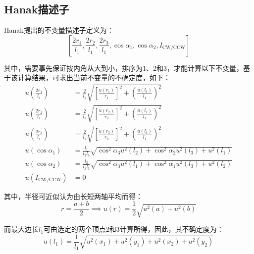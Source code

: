 \documentclass{article}
\begin{document}
\subsection{Hanak描述子}
Hanak\cite{hanakCraterIdentificationAlgorithm2010}提出的不变量描述子定义为：
\begin{equation}
  \left[\frac{2r_1}{l_1},\frac{2r_2}{l_1},\frac{2r_3}{l_1},\cos\alpha_1,\cos\alpha_2,I_\mathrm{CW/CCW}\right]
\end{equation}\par
其中，需要事先保证按内角从大到小，排序为1、2和3，才能计算以下不变量，基于该计算结果，可求出当前不变量的不确定度，如下：
\begin{equation}
  \begin{aligned}
    u\left(\frac{2r_1}{l_1}\right)&=\frac{2}{l_1}\sqrt{\left[\frac{u(r_1)}{r_1}\right]^2+\left(\frac{u(l_1)}{l_1}\right)^2}\\
    u\left(\frac{2r_2}{l_1}\right)&=\frac{2}{l_1}\sqrt{\left[\frac{u(r_2)}{r_2}\right]^2+\left(\frac{u(l_1)}{l_1}\right)^2}\\
    u\left(\frac{2r_3}{l_1}\right)&=\frac{2}{l_1}\sqrt{\left[\frac{u(r_3)}{r_3}\right]^2+\left(\frac{u(l_1)}{l_1}\right)^2}\\
    u(\cos\alpha_1)&=\frac{l_1}{l_2l_3}\sqrt{\cos^2\alpha_3u^2(l_2)+\cos^2\alpha_2u^2(l_3)+u^2(l_1)}\\
    u(\cos\alpha_2)&=\frac{l_2}{l_1l_3}\sqrt{\cos^2\alpha_3u^2(l_1)+\cos^2\alpha_1u^2(l_3)+u^2(l_2)}\\
    u(I_\mathrm{CW/CCW})&=0
  \end{aligned}
\end{equation}\par
其中，半径可近似认为由长短两轴平均而得：
\begin{equation*}
  r=\frac{a+b}{2}\implies u(r)=\frac{1}{2}\sqrt{u^2(a)+u^2(b)}
\end{equation*}\par
而最大边长$l_1$可由选定的两个顶点2和3计算所得，因此，其不确定度为：
\begin{equation*}
  u(l_1)=\frac{1}{l_1}\sqrt{u^2(x_1)+u^2(y_1)+u^2(x_2)+u^2(y_2)}
\end{equation*}\par
\end{document}
